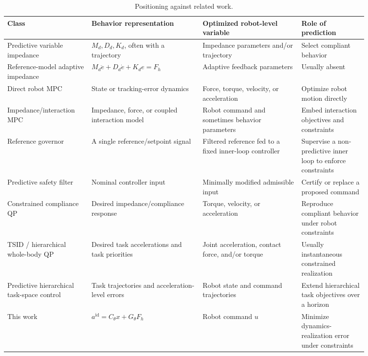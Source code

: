 \documentclass[journal]{IEEEtran}
\begin{document}
\begin{table}[t]
\centering
\caption{Positioning against related work.}
\label{tab:related}
\small
\begin{tabular}{@{}>{\raggedright\arraybackslash}p{0.19\linewidth}
>{\raggedright\arraybackslash}p{0.27\linewidth}
>{\raggedright\arraybackslash}p{0.24\linewidth}
>{\raggedright\arraybackslash}p{0.16\linewidth}@{}}
\toprule
Class & Behavior representation & Optimized robot-level variable & Role of prediction \\
\midrule
Predictive variable impedance & $M_d,D_d,K_d$, often with a trajectory & Impedance parameters and/or trajectory & Select compliant behavior \\
Reference-model adaptive impedance & $M_d\ddot e+D_d\dot e+K_de=F_h$ & Adaptive feedback parameters & Usually absent \\
Direct robot MPC & State or tracking-error dynamics & Force, torque, velocity, or acceleration & Optimize robot motion directly \\
Impedance/interaction MPC & Impedance, force, or coupled interaction model & Robot command and sometimes behavior parameters & Embed interaction objectives and constraints \\
Reference governor & A single reference/setpoint signal & Filtered reference fed to a fixed inner-loop controller & Supervise a non-predictive inner loop to enforce constraints \\
Predictive safety filter & Nominal controller input & Minimally modified admissible input & Certify or replace a proposed command \\
Constrained compliance QP & Desired impedance/compliance response & Torque, velocity, or acceleration & Reproduce compliant behavior under robot constraints \\
TSID / hierarchical whole-body QP & Desired task accelerations and task priorities & Joint acceleration, contact force, and/or torque & Usually instantaneous constrained realization \\
Predictive hierarchical task-space control & Task trajectories and acceleration-level errors & Robot state and command trajectories & Extend hierarchical task objectives over a horizon \\
This work & $a^{\mathrm{id}}=C_\theta x+G_\theta F_h$ & Robot command $u$ & Minimize dynamics-realization error under constraints \\
\bottomrule
\end{tabular}
\end{table}
\end{document}
